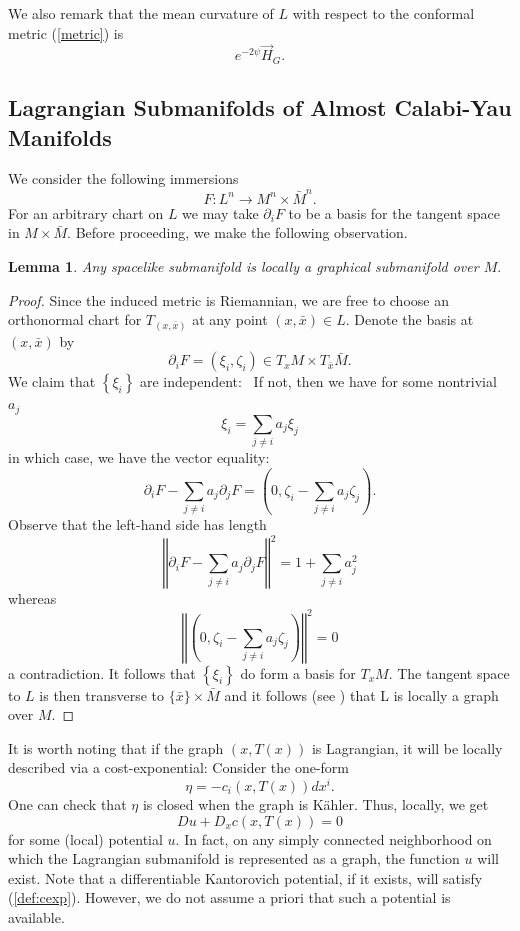 \documentclass[12pt,letterpaper]{amsart}%
\newcounter{mycounter}
\numberwithin{mycounter}{section}
\theoremstyle{plain}
\newtheorem{lemma}[mycounter]{Lemma}
\numberwithin{equation}{section}
\theoremstyle{definition}
\begin{document}
We also remark that the mean curvature of $L$ with respect to the conformal metric (\ref{metric}) is
\[
e^{-2\psi} \vec{H}_G.
\]


\subsection{Lagrangian Submanifolds of Almost Calabi-Yau Manifolds}

We consider the following immersions 
$$ F : L^n \to M^n\times \bar{M}^n.$$ For an arbitrary chart on $L$ we may take $\partial_iF$ to be a basis for the tangent space in  $M \times \bar{M}$. Before proceeding, we make the following observation.

\begin{lemma} \label{graphical}
Any spacelike submanifold is locally a graphical submanifold over $M.$ 
\end{lemma}

\begin{proof}
Since the induced metric is Riemannian, we are free to choose an orthonormal chart
for $T_{(x,\bar{x})}$ at any point $(x,\bar{x})\in L$. Denote the basis at $(x,\bar{x})$ by
\[
\partial_{i}F=\left(  \xi_{i},\zeta_{i}\right)  \in T_{x}M\times T_{\bar{x}}\bar{M}.
\]
We claim that $\left\{  \xi_{i}\right\}  $ are independent: \ If not, then
we have for some nontrivial $a_{j}$
\[
\xi_{i}=\sum_{j\neq i}a_{j}\xi_{j}%
\]
in which case, we have the vector equality:%
\[
\partial_{i}F-\sum_{j\neq i}a_{j}\partial_{j}F=\left(  0,\zeta_{i}-\sum_{j\neq i}a_{j}%
\zeta_{j}\right)  .
\]
Observe that the left-hand side has length
\[
\left\Vert \partial_{i}F-\sum_{j\neq i}a_{j}\partial_{j}F\right\Vert ^{2}=1+\sum_{j\neq
i}a_{j}^{2}%
\]
whereas
\[
\left\Vert \left(  0,\zeta_{i}-\sum_{j\neq i}a_{j}\zeta_{j}\right)
\right\Vert ^{2}=0
\] a contradiction. 
It follows that $\left\{  \xi_{i}\right\}  $ do form a basis for $T_{x}M.$ The tangent space to $L$ is then transverse to $ \{\bar{x}\} \times \bar{M}$ and it follows (see \cite[Corollary 6.33]{Lee}) that L is locally a graph over $M$. 

\end{proof}

It is worth noting that if the graph $(x,T(x))$ is Lagrangian, it will be
locally described via a cost-exponential: Consider the one-form
\[
\eta= -c_{i}(x,T(x))dx^{i}.
\]
One can check that $\eta$ is closed when the graph is K\"ahler. Thus, locally, we get
\begin{equation}\label{def:cexp}
Du + D_{x}c(x, T(x)) = 0
\end{equation}
for some (local) potential $u$.  In fact, on any simply connected neighborhood on which the Lagrangian submanifold is represented as a graph, the function $u$ will exist.   
Note that a differentiable Kantorovich potential, if it exists, will satisfy (\ref{def:cexp}). However, we do not assume a priori that such a potential is available.
\end{document}
